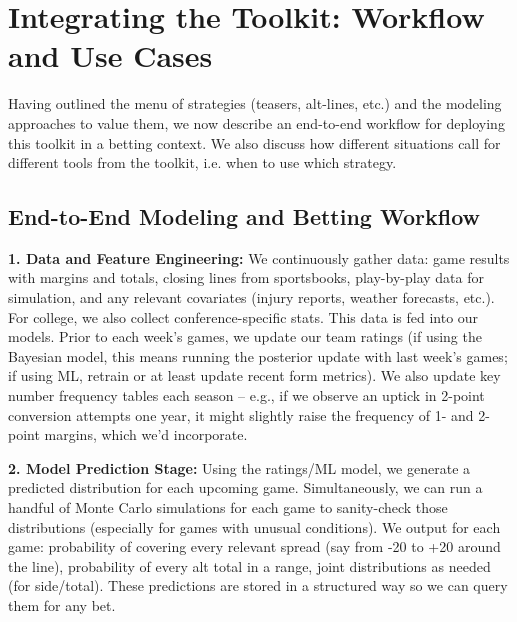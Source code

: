 \documentclass[11pt]{amsart}
\begin{document}
\section{Integrating the Toolkit: Workflow and Use Cases}
Having outlined the menu of strategies (teasers, alt-lines, etc.) and the modeling approaches to value them, we now describe an end-to-end workflow for deploying this toolkit in a betting context. We also discuss how different situations call for different tools from the toolkit, i.e. when to use which strategy.

\subsection{End-to-End Modeling and Betting Workflow}
\noindent \textbf{1. Data and Feature Engineering:} We continuously gather data: game results with margins and totals, closing lines from sportsbooks, play-by-play data for simulation, and any relevant covariates (injury reports, weather forecasts, etc.). For college, we also collect conference-specific stats. This data is fed into our models. Prior to each week’s games, we update our team ratings (if using the Bayesian model, this means running the posterior update with last week’s games; if using ML, retrain or at least update recent form metrics). We also update key number frequency tables each season – e.g., if we observe an uptick in 2-point conversion attempts one year, it might slightly raise the frequency of 1- and 2-point margins, which we’d incorporate.

\noindent \textbf{2. Model Prediction Stage:} Using the ratings/ML model, we generate a predicted distribution for each upcoming game. Simultaneously, we can run a handful of Monte Carlo simulations for each game to sanity-check those distributions (especially for games with unusual conditions). We output for each game: probability of covering every relevant spread (say from -20 to +20 around the line), probability of every alt total in a range, joint distributions as needed (for side/total). These predictions are stored in a structured way so we can query them for any bet.
\end{document}
